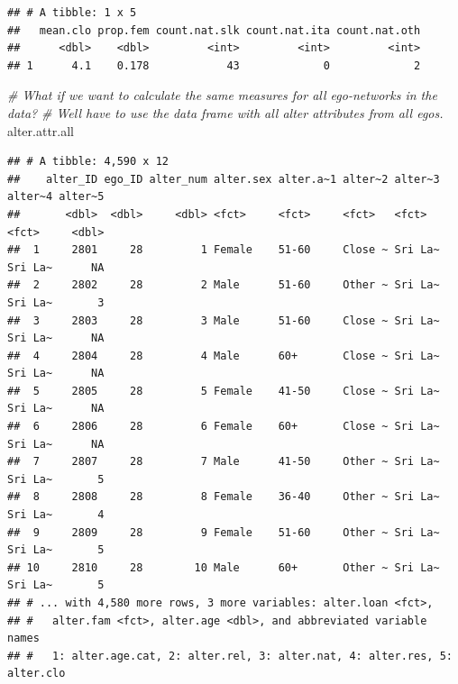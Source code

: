 \documentclass[
]{book}
\newenvironment{Shaded}{\begin{snugshade}}{\end{snugshade}}
\newcommand{\CommentTok}[1]{\textcolor[rgb]{0.56,0.35,0.01}{\textit{#1}}}
\newcommand{\NormalTok}[1]{#1}
\begin{document}
\begin{verbatim}
## # A tibble: 1 x 5
##   mean.clo prop.fem count.nat.slk count.nat.ita count.nat.oth
##      <dbl>    <dbl>         <int>         <int>         <int>
## 1      4.1    0.178            43             0             2
\end{verbatim}

\begin{Shaded}
\begin{Highlighting}[]
\CommentTok{\# What if we want to calculate the same measures for all ego{-}networks in the data?}
\CommentTok{\# We\textquotesingle{}ll have to use the data frame with all alter attributes from all egos.}
\NormalTok{alter.attr.all}
\end{Highlighting}
\end{Shaded}

\begin{verbatim}
## # A tibble: 4,590 x 12
##    alter_ID ego_ID alter_num alter.sex alter.a~1 alter~2 alter~3 alter~4 alter~5
##       <dbl>  <dbl>     <dbl> <fct>     <fct>     <fct>   <fct>   <fct>     <dbl>
##  1     2801     28         1 Female    51-60     Close ~ Sri La~ Sri La~      NA
##  2     2802     28         2 Male      51-60     Other ~ Sri La~ Sri La~       3
##  3     2803     28         3 Male      51-60     Close ~ Sri La~ Sri La~      NA
##  4     2804     28         4 Male      60+       Close ~ Sri La~ Sri La~      NA
##  5     2805     28         5 Female    41-50     Close ~ Sri La~ Sri La~      NA
##  6     2806     28         6 Female    60+       Close ~ Sri La~ Sri La~      NA
##  7     2807     28         7 Male      41-50     Other ~ Sri La~ Sri La~       5
##  8     2808     28         8 Female    36-40     Other ~ Sri La~ Sri La~       4
##  9     2809     28         9 Female    51-60     Other ~ Sri La~ Sri La~       5
## 10     2810     28        10 Male      60+       Other ~ Sri La~ Sri La~       5
## # ... with 4,580 more rows, 3 more variables: alter.loan <fct>,
## #   alter.fam <fct>, alter.age <dbl>, and abbreviated variable names
## #   1: alter.age.cat, 2: alter.rel, 3: alter.nat, 4: alter.res, 5: alter.clo
\end{verbatim}
\end{document}
